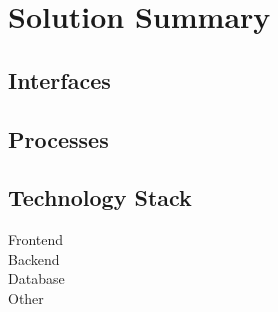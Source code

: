 \section{Solution Summary}\label{sec:summary}

\subsection{Interfaces}\label{sub:summary/interface}

\subsection{Processes}\label{sub:summary/processes}

\subsection{Technology Stack}\label{sub:summary/stack}
\begin{description}
    \item[Frontend]
    \item[Backend]
    \item[Database]
    \item[Other]
\end{description}
